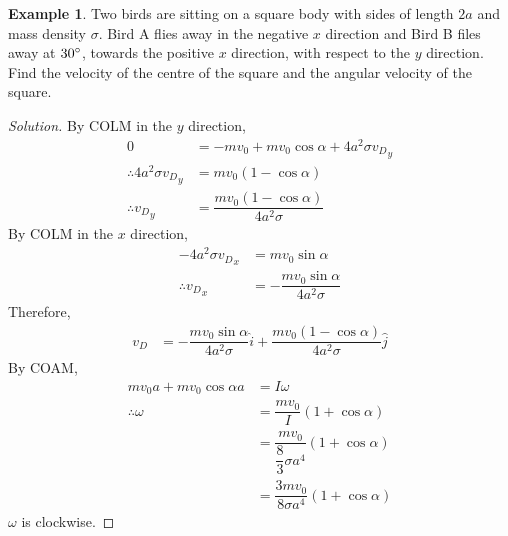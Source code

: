 \documentclass[fleqn, a4paper, 12pt]{article}
\theoremstyle{definition}
\newtheorem{example}{Example}
\theoremstyle{theorem}
\newenvironment{solution}
{\begin{proof}[Solution]\let\qed\relax}
	{\end{proof}}
\begin{document}
\begin{example}
	Two birds are sitting on a square body with sides of length $2a$ and mass density $\sigma$. Bird A flies away in the negative $x$ direction and Bird B files away at $30\degree$, towards the positive $x$ direction, with respect to the $y$ direction. Find the velocity of the centre of the square and the angular velocity of the square.\\
\end{example}

\begin{solution}
	By COLM in the $y$ direction,
	\begin{align*}
		0 &= -m v_0 + m v_0 \cos \alpha + 4 a^2 \sigma {v_D}_y\\
		\therefore 4 a^2 \sigma {v_D}_y &= m v_0 (1 - \cos \alpha)\\
		\therefore {v_D}_y &= \dfrac{m v_0 (1 - \cos \alpha)}{4 a^2 \sigma}
	\end{align*}
	By COLM in the $x$ direction,
	\begin{align*}
		-4 a^2 \sigma {v_D}_x &= m v_0 \sin \alpha\\
		\therefore {v_D}_x &= -\dfrac{m v_0 \sin \alpha}{4 a^2 \sigma}
	\end{align*}
	Therefore,
	\begin{align*}
		v_D &= - \dfrac{m v_0 \sin \alpha}{4 a^2 \sigma} \hat{i} + \dfrac{m v_0 (1 - \cos \alpha)}{4 a^2 \sigma} \hat{j}
	\end{align*}
	By COAM,
	\begin{align*}
		m v_0 a + m v_0 \cos \alpha a &= I \omega\\
		\therefore \omega &= \dfrac{m v_0}{I} (1 + \cos \alpha)\\
		&= \dfrac{m v_0}{\dfrac{8}{3} \sigma a^4} (1 + \cos \alpha)\\
		&= \dfrac{3 m v_0}{8 \sigma a^4} (1 + \cos \alpha)
	\end{align*}
	$\omega$ is clockwise.
\end{solution}
\end{document}
